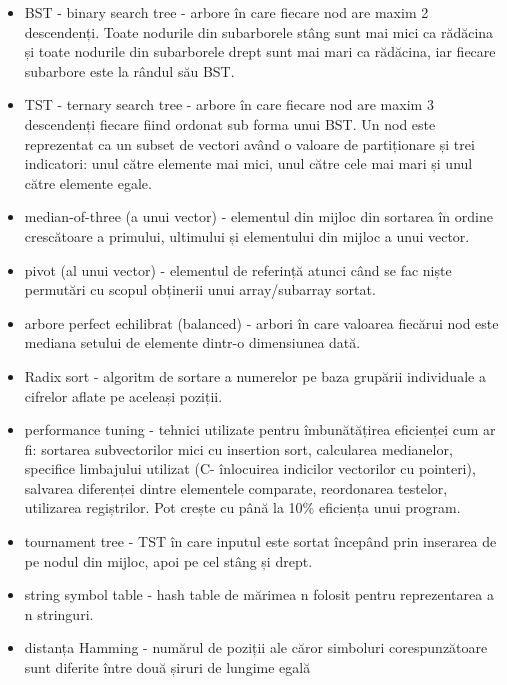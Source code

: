 \documentclass[12pt,a4paper]{article}
\begin{document}
\begin{singlespace}
\begin{itemize}
\item BST - binary search tree - arbore în care fiecare nod are maxim 2 descendenți. Toate nodurile din subarborele stâng sunt mai mici ca rădăcina și toate nodurile din subarborele drept sunt mai mari ca rădăcina, iar fiecare subarbore este la rândul său BST. 
\item TST - ternary search tree - arbore în care fiecare nod are maxim 3 descendenți fiecare fiind ordonat sub forma unui BST. Un nod este reprezentat ca un subset de vectori având o valoare de partiționare și trei indicatori: unul către elemente mai mici, unul către cele mai mari și unul către elemente egale.
\item median-of-three (a unui vector)  -  elementul din mijloc din sortarea în ordine crescătoare a primului, ultimului și elementului din mijloc a unui vector.
\item pivot (al unui vector) - elementul de referință atunci când se fac niște permutări cu scopul obținerii unui array/subarray sortat.
\item arbore perfect echilibrat (balanced) - arbori în care valoarea fiecărui nod este mediana setului de elemente dintr-o dimensiunea dată.
\item Radix sort - algoritm de sortare a numerelor pe baza grupării individuale a cifrelor aflate pe aceleași poziții.
\item performance tuning - tehnici utilizate pentru îmbunătățirea eficienței cum ar fi: sortarea subvectorilor mici cu insertion sort, calcularea medianelor, specifice limbajului utilizat (C- înlocuirea indicilor vectorilor cu pointeri), salvarea diferenței dintre elementele comparate, reordonarea testelor, utilizarea regiștrilor. Pot crește cu până la 10\% eficiența unui program.
\item tournament tree - TST în care inputul este sortat începând prin inserarea de pe nodul din mijloc, apoi pe cel stâng și drept. 
\item string symbol table - hash table de mărimea n folosit pentru reprezentarea a n stringuri.
\item  distanța Hamming - numărul de poziții ale căror simboluri corespunzătoare sunt diferite între două șiruri de lungime egală 
\end{itemize}

\end{singlespace}
\end{document}
